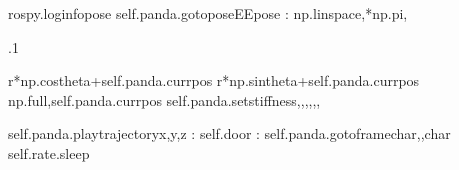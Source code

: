 \documentclass[letterpaper,10pt,english]{sphinxmanual}
\begin{document}
\begin{sphinxVerbatim}[commandchars=\\\{\}]
rospy.loginfopose
self.panda.go\PYGZus{}to\PYGZus{}pose\PYGZus{}EEpose
:
np.linspace,*np.pi,

.1

r*np.costheta+self.panda.curr\PYGZus{}pos\PYG{o}{[}\PYG{o}{]}
r*np.sintheta+self.panda.curr\PYGZus{}pos\PYG{o}{[}\PYG{o}{]}
np.full,self.panda.curr\PYGZus{}pos\PYG{o}{[}\PYG{o}{]}
self.panda.set\PYGZus{}stiffness,,,,,,

self.panda.play\PYGZus{}trajectoryx,y,z
:
self.door
:
self.panda.go\PYGZus{}to\PYGZus{}framechar\PYG{o}{[}\PYG{o}{]},,char\PYG{o}{[}\PYG{o}{]}
self.rate.sleep
\end{sphinxVerbatim}
\end{document}
